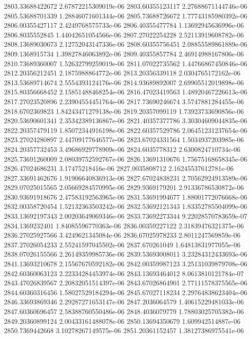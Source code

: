 {2803.33688422672 2.67872215309019e-06
2803.60355123117 2.27688671144746e-06
2805.53688701339 1.28846071601344e-06
2805.73688726672 1.77743185980392e-06
2806.00355427117 2.4249768575733e-06
2806.40355477784 1.13692945636996e-06
2806.8035552845 1.44042651054566e-06
2807.27022254228 2.52113919608782e-06
2808.13689030673 2.12752043147336e-06
2808.60355756451 2.08855589861889e-06
2809.1368915734 1.39827846063892e-06
2809.40355857784 2.46914988167806e-06
2810.73689360007 1.52632799259019e-06
2811.07022735562 1.44766867450846e-06
2812.20356212451 2.1875988864772e-06
2813.20356339118 2.0304765172162e-06
2813.53689714674 2.5554393124176e-06
2814.93689892007 2.69905512019898e-06
2815.80356668452 2.15851488468254e-06
2816.47023419563 1.48920467226613e-06
2817.27023520896 2.23904554451764e-06
2817.73690246674 3.5747881284455e-06
2818.6702369823 1.84243471279138e-06
2819.20357099119 1.73923733690856e-06
2820.53690601341 2.35342389136867e-06
2821.40357377786 3.30304609044835e-06
2822.20357479119 1.85072344916198e-06
2822.60357529786 2.06451231237654e-06
2823.27024280897 2.44709177646577e-06
2823.67024331564 1.5034937203985e-06
2824.20357732453 3.49686929778909e-06
2824.6035778312 2.6300824710734e-06
2825.73691260009 2.08039752592767e-06
2826.13691310676 1.75675168658345e-06
2826.47024686231 3.17475218416e-06
2827.0035808712 2.16245537612781e-06
2827.33691462676 1.91906640836913e-06
2827.67024838231 2.70562924913589e-06
2829.07025015565 2.05669284570995e-06
2829.9369179201 2.91336786530872e-06
2830.93691918676 2.47583192563965e-06
2831.53691994677 1.88001772076668e-06
2832.00358720454 1.52132363503242e-06
2832.53692121343 1.83352785504099e-06
2833.13692197343 2.00203649069346e-06
2833.73692273344 9.22028570783659e-07
2834.1369232401 1.84085596770363e-06
2836.00359227122 2.31839476321375e-06
2836.27025927566 3.4249621345084e-06
2836.67025978233 2.8011247569859e-06
2837.27026054233 2.55241597045502e-06
2837.670261049 1.64813831977055e-06
2838.07026155566 2.26149359985736e-06
2839.53693008011 3.23284312433693e-06
2841.13693210678 2.15567670592182e-06
2842.00359987123 3.25131039879708e-06
2842.60360063123 2.22334284453974e-06
2843.13693464012 8.0613810121784e-07
2843.47026839567 2.20832051514397e-06
2843.67026864901 2.77111578375565e-06
2844.60360316456 1.58027529184294e-06
2845.67027118234 2.29764838623404e-06
2846.33693869346 2.29287271653147e-06
2847.2036064579 1.40615229481033e-06
2847.60360696457 2.58388760550486e-06
2848.4036079779 1.78803025705382e-06
2849.20360899124 2.00433161488078e-06
2850.13694350679 1.609942514887e-06
2850.7369442668 3.10278267149575e-06
2851.20361152457 1.38127386975541e-06
}
